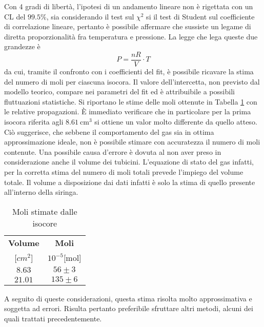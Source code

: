 \documentclass[a4paper,11pt,oneside]{article}
\begin{document}
\newpage
Con 4 gradi di libertà, l'ipotesi di un andamento lineare non è rigettata con un CL del $99.5\%$, sia considerando il test sul $\chi^{2}$ si il test di Student sul coefficiente di correlazione lineare, pertanto è possibile  affermare che sussiste un legame di diretta proporzionalità fra temperatura e pressione.
La legge che lega queste due grandezze è
\begin{equation*}
    P=\frac{nR}{V}\cdot T
\end{equation*}
da cui, tramite il confronto con i coefficienti del fit, è possibile ricavare la stima del numero di moli per ciascuna isocora. Il valore dell'intercetta, non previsto dal modello teorico, compare nei parametri del fit ed è attribuibile a possibili fluttuazioni statistiche.
Si riportano le stime delle moli ottenute in Tabella \ref{tab:moli_isocore} con le relative propagazioni. È immediato verificare che in particolare per la prima isocora riferita agli $\SI{8.61}{\centi\meter\cubed}$ si ottiene un valor molto differente da quello atteso. Ciò suggerisce, che sebbene il comportamento del gas sia in ottima approssimazione ideale, non è possibile stimare con accuratezza il numero di moli contenute. Una possibile causa d'errore è dovuta al non aver preso in considerazione anche il volume dei tubicini. L'equazione di stato del gas infatti, per la corretta stima del numero di moli totali prevede l'impiego del volume totale. Il volume a disposizione dai dati infatti è solo la stima di quello presente all'interno della siringa.

\begin{table}[h!]
    \centering
    \begin{tabular}{|c|c|}
        \hline
        \textbf{Volume} & \textbf{Moli} \\
        \si{[$cm^2$]} & $10^{-5}$[mol] \\ \hline
        \rowcolor[rgb]{0.85,0.85,0.85}$8.63$ & $56\pm3$\\ \hline
        $21.01$ & $135\pm6$\\ \hline
    \end{tabular}
    \caption{Moli stimate dalle isocore}
    \label{tab:moli_isocore}
\end{table}


A seguito di queste considerazioni, questa stima risolta molto approssimativa e soggetta ad errori. Risulta pertanto preferibile sfruttare altri metodi, alcuni dei quali trattati precedentemente.
\end{document}
